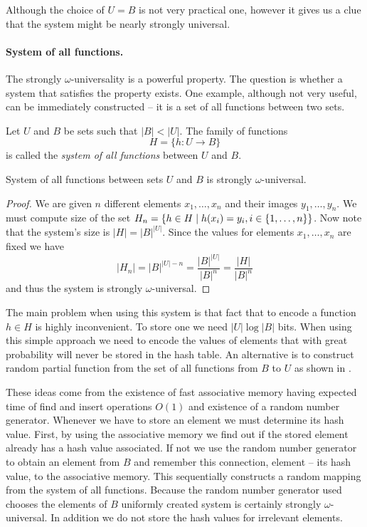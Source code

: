 Although the choice of $U = B$ is not very practical one, however it gives us a clue that the system might be nearly strongly universal.

\paragraph{System of all functions.}
The strongly $\omega$-universality is a powerful property. The question is whether a system that satisfies the property exists. One example, although not very useful, can be immediately constructed -- it is a set of all functions between two sets.

\begin{definition}
Let $U$ and $B$ be sets such that $|B| < |U|$. The family of functions
\[
H = \{h: U \rightarrow B \}
\]
is called the \emph{system of all functions} between $U$ and $B$.
\end{definition}

\begin{remark}
System of all functions between sets $U$ and $B$ is strongly $\omega$-universal.
\end{remark}
\begin{proof}
We are given $n$ different elements $x_1, \dots, x_n$ and their images $y_1, \dots, y_n$. We must compute size of the set $H_n = \lbrace h \in H \mid h(x_i) = y_i, i \in \lbrace 1, \dots, n\rbrace \rbrace$. Now note that the system's size is $|H| = {|B|}^{|U|}$. Since the values for elements $x_1, \dots, x_n$ are fixed we have \[ |H_n| = {|B|}^{|U| - n} = \frac{{|B|}^{|U|}}{{|B|}^{n}} = \frac{|H|}{|B|^n} \] and thus the system is strongly $\omega$-universal.
\end{proof}

The main problem when using this system is that fact that to encode a function $h \in H$ is highly inconvenient. To store one we need $|U| \log |B|$ bits. When using this simple approach we need to encode the values of elements that with great probability will never be stored in the hash table. An alternative is to construct random partial function from the set of all functions from $B$ to $U$ as shown in \cite{1382617}. 

These ideas come from the existence of fast associative memory having expected time of find and insert operations $O(1)$ and existence of a random number generator. Whenever we have to store an element we must determine its hash value. First, by using the associative memory we find out if the stored element already has a hash value associated. If not we use the random number generator to obtain an element from $B$ and remember this connection, element -- its hash value, to the associative memory. This sequentially constructs a random mapping from the system of all functions. Because the random number generator used chooses the elements of $B$ uniformly created system is certainly strongly $\omega$-universal. In addition we do not store the hash values for irrelevant elements. 

